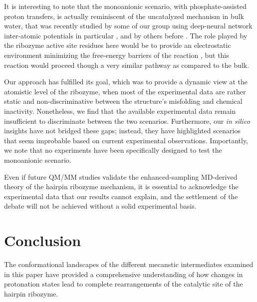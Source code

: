 \documentclass[journal=jacsat,manuscript=article]{achemso}
\begin{document}
It is interesting to note that the monoanionic scenario, 
with phosphate-assisted proton transfers, 
is actually reminiscent of the uncatalyzed mechanism in bulk water, 
that was recently studied by some of our group using deep-neural network inter-atomic potentials in particular \cite{benayad_molecular_2022,benayad_molecular_2023}, 
and by others before \cite{florian_phosphate_1998,duarte_resolving_2015}. 
The role played by the ribozyme active site residues here would be to 
provide an electrostatic environment minimizing the free-energy barriers of the reaction \cite{warshel_electrostatic_2006}, 
but this reaction would proceed though a very similar pathway as compared to the bulk.

Our approach has fulfilled its goal, which was to provide a dynamic view at the atomistic level of the ribozyme,
when most of the experimental data are rather static and non-discriminative 
between the structure's misfolding and chemical inactivity.
Nonetheless, we find that the available experimental data remain insufficient to discriminate between the two scenarios.
Furthermore, our \textit{in silico} insights have not bridged these gaps;
instead, they have highlighted scenarios that seem improbable based on current experimental observations.
Importantly, we note that no experiments have been specifically designed to test the monoanionic scenario.

Even if future QM/MM studies validate the enhanced-sampling \acrshort{MD}-derived theory of the hairpin ribozyme mechanism,
it is essential to acknowledge the experimental data that our results cannot explain, 
and the settlement of the debate will not be achieved without a solid experimental basis.

\section{Conclusion}

The conformational landscapes of the different mecanstic intermediates examined in this paper have provided a comprehensive understanding of how changes in protonation states lead to complete rearrangements of the catalytic site of the hairpin ribozyme. 


\end{document}
